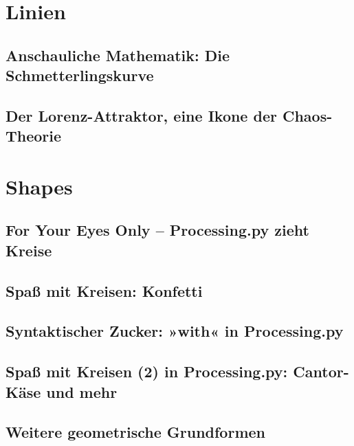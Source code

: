 \documentclass[10pt,german,]{book}
\begin{document}
\chapter{Linien}\label{linien}

\section{Anschauliche Mathematik: Die
Schmetterlingskurve}\label{anschauliche-mathematik-die-schmetterlingskurve}

\section{Der Lorenz-Attraktor, eine Ikone der
Chaos-Theorie}\label{der-lorenz-attraktor-eine-ikone-der-chaos-theorie}

\chapter{Shapes}\label{shapes}

\section{For Your Eyes Only -- Processing.py zieht
Kreise}\label{for-your-eyes-only-processing.py-zieht-kreise}

\section{Spaß mit Kreisen: Konfetti}\label{spauxdf-mit-kreisen-konfetti}

\section{Syntaktischer Zucker: »with« in
Processing.py}\label{syntaktischer-zucker-with-in-processing.py}

\section{Spaß mit Kreisen (2) in Processing.py: Cantor-Käse und
mehr}\label{spauxdf-mit-kreisen-2-in-processing.py-cantor-kuxe4se-und-mehr}

\section{Weitere geometrische
Grundformen}\label{weitere-geometrische-grundformen}
\end{document}
